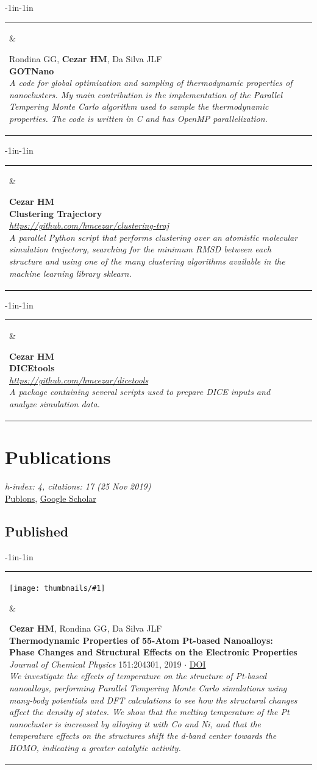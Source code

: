 \documentclass[10pt]{article}
\newcommand{\newarticle}[7]{
\begin{adjustwidth}{-1in}{-1in}  
\begin{tabular}{p{0.9in}p{7in}}
\parbox[c]{0.9in}{\texttt{[image: thumbnails/\#1]}} & \parbox[c]{6in}{\setstretch{0.9} {\scriptsize {#2}} \\ {\bf #3}  \\ {\small #4} $\cdot$ \href{#6}{#5} \\ {\footnotesize\emph {#7}}}
\end{tabular}
\end{adjustwidth}
\vspace{0.2in}
}
\newcommand{\newsoftware}[3]{
\begin{adjustwidth}{-1in}{-1in}  
\begin{tabular}{p{0.9in}p{7in}}
\parbox[c]{0.9in}{} & \parbox[c]{6in}{\setstretch{0.9} {\scriptsize {#1}} \\ {\bf #2}  \\ {\footnotesize\emph {#3}}}
\end{tabular}
\end{adjustwidth}
\vspace{0.2in}
}
\begin{document}
\newsoftware{Rondina GG, \textbf{Cezar HM}, Da Silva JLF}{GOTNano}{A code for global optimization and sampling of thermodynamic properties of nanoclusters. My main contribution is the implementation of the Parallel Tempering Monte Carlo algorithm used to sample the thermodynamic properties. The code is written in C and has OpenMP parallelization.}

\newsoftware{\textbf{Cezar HM}}{Clustering Trajectory}{\href{https://github.com/hmcezar/clustering-traj}{https://github.com/hmcezar/clustering-traj} \\ A parallel Python script that performs clustering over an atomistic molecular simulation trajectory, searching for the minimum RMSD between each structure and using one of the many clustering algorithms available in the machine learning library sklearn.}

\newsoftware{\textbf{Cezar HM}}{DICEtools}{\href{https://github.com/hmcezar/dicetools}{https://github.com/hmcezar/dicetools} \\ A package containing several scripts used to prepare DICE inputs and analyze simulation data.}


\section*{Publications}


\textit{h-index: 4, citations: 17 (25 Nov 2019)} \\
\href{https://publons.com/researcher/2003548/}{Publons}, 
\href{https://scholar.google.com.br/citations?hl=pt-BR&user=LtBk3gEAAAAJ}{Google Scholar} 




\subsection*{Published}

\newarticle{ptmc_pt_alloys.png}{\textbf{Cezar HM}, Rondina GG, Da Silva JLF}{Thermodynamic Properties of 55-Atom Pt-based Nanoalloys: Phase Changes and Structural Effects on the Electronic Properties}{\emph{Journal of Chemical Physics} 151:204301, 2019}{DOI}{http://dx.doi.org/10.1063/1.5125689}{We investigate the effects of temperature on the structure of Pt-based nanoalloys, performing Parallel Tempering Monte Carlo simulations using many-body potentials and DFT calculations to see how the structural changes affect the density of states. We show that the melting temperature of the Pt nanocluster is increased by alloying it with Co and Ni, and that the temperature effects on the structures shift the \emph{d}-band center towards the HOMO, indicating a greater catalytic activity.}
\end{document}
